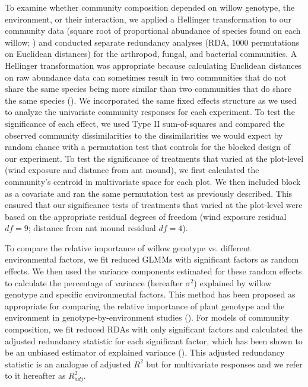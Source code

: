 \documentclass[11pt]{article}
\begin{document}
To examine whether community composition depended on willow genotype,
the environment, or their interaction, we applied a Hellinger
transformation to our community data (square root of proportional
abundance of species found on each willow; \citealt{Legendre_2001}) and
conducted separate redundancy analyses (RDA, 1000 permutations on
Euclidean distances) for the arthropod, fungal, and bacterial
communities. A Hellinger transformation was appropriate because
calculating Euclidean distances on raw abundance data can sometimes
result in two communities that do not share the same species being more
similar than two communities that do share the same species
(\citealt{Legendre_2001}). We incorporated the same fixed effects structure
as we used to analyze the univariate community responses for each
experiment. To test the significance of each effect, we used Type II
sum-of-squares and compared the observed community dissimilarities to
the dissimilarities we would expect by random chance with a permutation
test that controls for the blocked design of our experiment. To test the
significance of treatments that varied at the plot-level (wind exposure
and distance from ant mound), we first calculated the community's
centroid in multivariate space for each plot. We then included block as
a covariate and ran the same permutation test as previously described.
This ensured that our significance tests of treatments that varied at
the plot-level were based on the appropriate residual degrees of freedom
(wind exposure residual \(df=9\); distance from ant mound
residual \(df=4\)).

To compare the relative importance of willow genotype vs. different
environmental factors, we fit reduced GLMMs with significant factors as
random effects. We then used the variance components estimated for these
random effects to calculate the percentage of variance (hereafter
\(\sigma^2\)) explained by willow genotype and specific
environmental factors. This method has been proposed as appropriate for
comparing the relative importance of plant genotype and the environment
in genotype-by-environment studies (\citealt{Johnson_2005, Hersch_Green_2011}). For
models of community composition, we fit reduced RDAs with only
significant factors and calculated the adjusted redundancy statistic for
each significant factor, which has been shown to be an unbiased
estimator of explained variance (\citealt{Peres_Neto_2006}). This adjusted
redundancy statistic is an analogue of adjusted \(R^2\) but for
multivariate responses and we refer to it hereafter as \(R^2_{adj}\).
\end{document}
